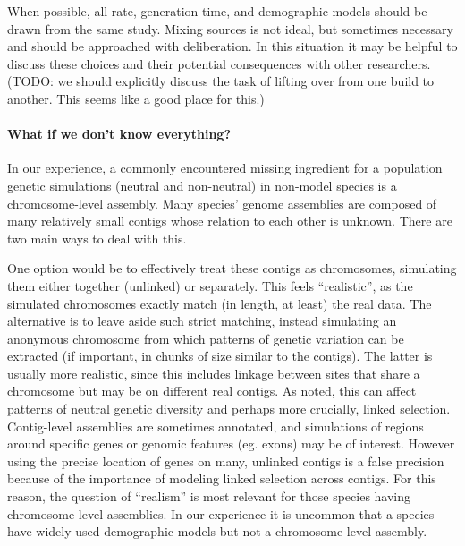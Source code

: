 \documentclass[hidelinks]{article}
\begin{document}
When possible, all rate, generation time, and demographic models should
be drawn from the same study. Mixing sources is not ideal, but sometimes
necessary and should be approached with deliberation. In this situation
it may be helpful to discuss these choices and their potential
consequences with other researchers.
(TODO: we should explicitly discuss the task of lifting over from one build to
another. This seems like a good place for this.)

\hypertarget{what-if-we-dont-know-everything}{%
\paragraph{What if we don't know
everything?}\label{what-if-we-dont-know-everything}}

In our experience, a commonly encountered missing ingredient for a
population genetic simulations (neutral and non-neutral) in non-model
species is a chromosome-level assembly. Many species' genome assemblies
are composed of many relatively small contigs whose relation to each
other is unknown. There are two main ways to deal with this.

One option would be to effectively treat these contigs as chromosomes,
simulating them either together (unlinked) or separately. This feels
``realistic'', as the simulated chromosomes exactly match (in length, at
least) the real data. The alternative is to leave aside such strict
matching, instead simulating an anonymous chromosome from which patterns
of genetic variation can be extracted (if important, in chunks of size
similar to the contigs). The latter is usually more realistic,
since this includes linkage between sites that share a chromosome but
may be on different real contigs. As noted, this can affect patterns of neutral genetic
diversity and perhaps more crucially, linked selection. Contig-level
assemblies are sometimes annotated, and simulations of regions around
specific genes or genomic features (eg. exons) may be of interest.
However using the precise location of genes on many, unlinked contigs is
a false precision because of the importance of modeling linked selection
across contigs. For this reason, the question of ``realism'' is most
relevant for those species having chromosome-level assemblies. In our
experience it is uncommon that a species have widely-used demographic
models but not a chromosome-level assembly.
\end{document}
